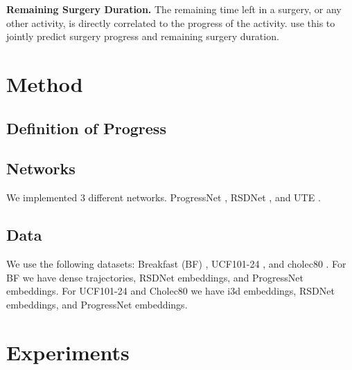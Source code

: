 \documentclass[10pt,twocolumn,letterpaper]{article}
\begin{document}
\textbf{Remaining Surgery Duration.} The remaining time left in a surgery, or any other activity, is directly correlated to the progress of the activity. \cite{twinanda2019} use this to jointly predict surgery progress and remaining surgery duration. 

\section{Method}
\label{sec:method}

\subsection{Definition of Progress}
\label{sec:method:progress}

\subsection{Networks}
We implemented 3 different networks. ProgressNet \cite{becattini2017}, RSDNet \cite{twinanda2019}, and UTE \cite{kukleva2019}.

\subsection{Data}
We use the following datasets: Breakfast (BF) \cite{kuehne2014,kuehne2016}, UCF101-24 \cite{soomro2012}, and cholec80 \cite{nwoye2022}. For BF we have dense trajectories, RSDNet embeddings, and ProgressNet embeddings. For UCF101-24 and Cholec80 we have i3d embeddings, RSDNet embeddings, and ProgressNet embeddings.


\section{Experiments}
\label{sec:experiments}
\end{document}
